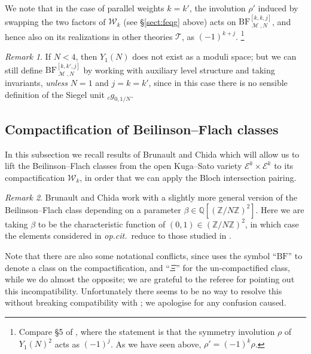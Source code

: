 \documentclass[11pt, a4paper, reqno]{amsart}
\theoremstyle{definition}
\theoremstyle{plain}
\theoremstyle{remark}
\newtheorem*{remark}{Remark}
\DeclareMathOperator{\mot}{\mathscr{M}}
\newcommand{\numberset}{\mathbb}
\newcommand{\Q}{\numberset{Q}}
\newcommand{\Z}{\numberset{Z}}
\newcommand{\Ell}{\mathcal{E}}
\newcommand{\KS}{\mathscr{W}}
\newcommand{\theory}{\mathcal{T}}
\newcommand{\BF}{\mathrm{BF}}
\begin{document}
  We note that in the case of parallel weights $k = k'$, the involution $\rho'$ induced by swapping the two factors of $\KS_k$ (see \S \ref{sect:feqg} above) acts on $\BF^{[k,k,j]}_{\mot,N}$, and hence also on its realizations in other theories $\theory$, as $(-1)^{k + j}$. \footnote{Compare \S 5 of \cite{KLZ17}, where the statement is that the symmetry involution $\rho$ of $Y_1(N)^2$ acts as $(-1)^j$. As we have seen above, $\rho' = (-1)^k \rho$.}

  \begin{remark}
   If $N < 4$, then $Y_1(N)$ does not exist as a moduli space; but we can still define $\BF^{[k,k',j]}_{\mot, N}$ by working with auxiliary level structure and taking invariants, \emph{unless} $N = 1$ and $j = k = k'$, since in this case there is no sensible definition of the Siegel unit ${}_c g_{0, 1/N}$.
  \end{remark}

 \subsection{Compactification of Beilinson--Flach classes}
 \label{subsec:compactification-bf}

  In this subsection we recall results of Brunault and Chida \cite[\S 7-8]{brunaultchida16} which will allow us to lift the Beilinson--Flach classes from the open Kuga--Sato variety $\Ell^k \times \Ell^k$ to its compactification $\KS_k$, in order that we can apply the Bloch intersection pairing.
  
  \begin{remark}
   Brunault and Chida work with a slightly more general version of the Beilinson--Flach class depending on a parameter $\beta \in \Q[(\Z / N\Z)^2]$. Here we are taking $\beta$ to be the characteristic function of $(0, 1) \in (\Z / N\Z)^2$, in which case the elements considered in \emph{op.cit.}~reduce to those studied in \cite{KLZ20}.
   
   Note that there are also some notational conflicts, since \cite{brunaultchida16} uses the symbol ``$\BF$'' to denote a class on the compactification, and ``$\Xi$'' for the un-compactified class, while we do almost the opposite; we are grateful to the referee for pointing out this incompatibility. Unfortunately there seems to be no way to resolve this without breaking compatibility with \cite{KLZ20}; we apologise for any confusion caused.\end{remark}
\end{document}
